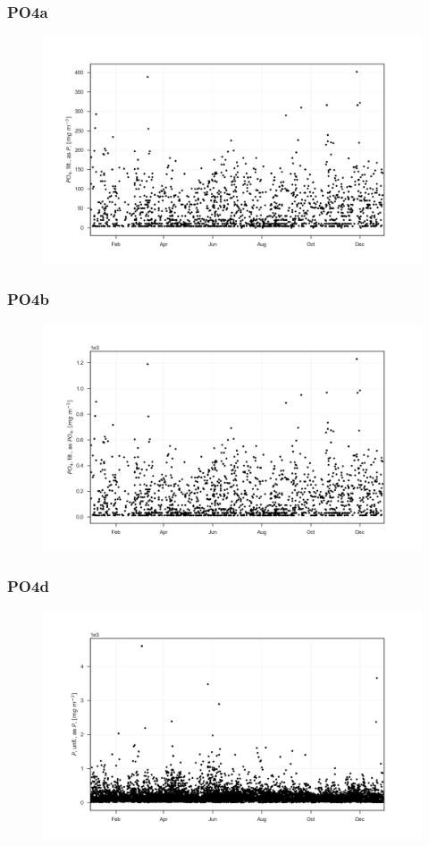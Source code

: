 \documentclass{beamer}
\begin{document}
\begin{frame}
\frametitle{PO4a}
\begin{figure}
\includegraphics[width=\textwidth]{rivers/all/1yr_graph/PO4a.png}
\end{figure}
\end{frame}

\begin{frame}
\frametitle{PO4b}
\begin{figure}
\includegraphics[width=\textwidth]{rivers/all/1yr_graph/PO4b.png}
\end{figure}
\end{frame}

\begin{frame}
\frametitle{PO4d}
\begin{figure}
\includegraphics[width=\textwidth]{rivers/all/1yr_graph/PO4d.png}
\end{figure}
\end{frame}
\end{document}
